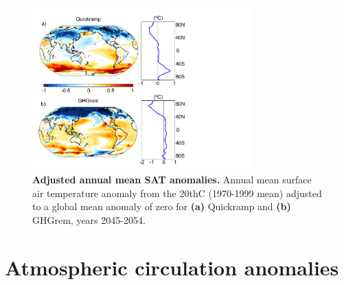 \documentclass[grl]{AGUTeX}  %
\begin{document}
\begin{article}
\begin{figure}[htbp] 
\centering
 \noindent\includegraphics[width=20pc]{figures/SATnormmaps_remgm.pdf}
\caption{\textbf{Adjusted annual mean SAT anomalies.} Annual mean surface air temperature anomaly from the 20thC (1970-1999 mean) adjusted to a global mean anomaly of zero for \textbf{(a)} Quickramp and \textbf{(b)} GHGrem, years 2045-2054. }
\label{fig:satnorm}
\end{figure}

\section{Atmospheric circulation anomalies}


\end{article}
\end{document}
